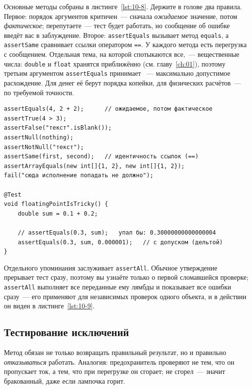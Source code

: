Основные методы собраны в листинге~\ref{lst:10-8}. Держите в голове два правила. Первое: порядок аргументов критичен~--- сначала \emph{ожидаемое} значение, потом \emph{фактическое}; перепутаете~--- тест будет работать, но сообщение об ошибке введёт вас в заблуждение. Второе: \texttt{assertEquals} вызывает метод \texttt{equals}, а \texttt{assertSame} сравнивает ссылки оператором \texttt{==}. У каждого метода есть перегрузка с сообщением. Отдельная тема, на которой спотыкаются все,~--- вещественные числа: \texttt{double} и \texttt{float} хранятся приближённо (см. главу~\ref{ch:01}), поэтому третьим аргументом \texttt{assertEquals} принимает ~--- максимально допустимое расхождение. Для денег её берут порядка копейки, для физических расчётов~--- по требуемой точности.

\begin{listing}[H]
\begin{verbatim}
assertEquals(4, 2 + 2);      // ожидаемое, потом фактическое
assertTrue(4 > 3);
assertFalse("текст".isBlank());
assertNull(nothing);
assertNotNull("текст");
assertSame(first, second);   // идентичность ссылок (==)
assertArrayEquals(new int[]{1, 2}, new int[]{1, 2});
fail("сюда исполнение попадать не должно");

@Test
void floatingPointIsTricky() {
    double sum = 0.1 + 0.2;

    // assertEquals(0.3, sum);   упал бы: 0.30000000000000004
    assertEquals(0.3, sum, 0.000001);   // с допуском (дельтой)
}
\end{verbatim}
\caption{Методы Assertions, дельта и групповая проверка}
\label{lst:10-8}
\end{listing}

Отдельного упоминания заслуживает \texttt{assertAll}. Обычное утверждение прерывает тест сразу, поэтому вы узнаёте только о первой сломавшейся проверке; \texttt{assertAll} выполняет все переданные ему лямбды и показывает все ошибки сразу~--- его применяют для независимых проверок одного объекта, и в действии он виден в листинге~\ref{lst:10-9}.

\subsection{Тестирование исключений}

Метод обязан не только возвращать правильный результат, но и правильно \emph{отказываться} работать. Аналогия: предохранитель проверяют не тем, что он пропускает ток, а тем, что при перегрузке он сгорает; не сгорел~--- значит бракованный, даже если лампочка горит.

